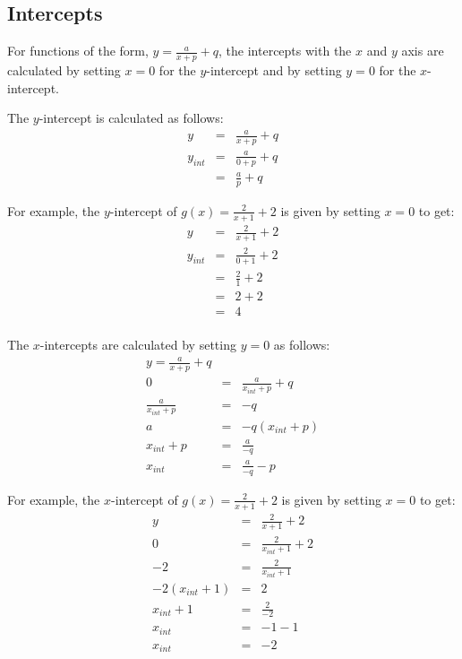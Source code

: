 \subsection{Intercepts}
For functions of the form, $y=\frac{a}{x+p} + q$, the intercepts with the $x$ and $y$ axis are calculated by setting $x=0$ for the $y$-intercept and by setting $y=0$ for the $x$-intercept.

The $y$-intercept is calculated as follows:
\begin{eqnarray}
y&=&\frac{a}{x+p} + q\\
y_{int}&=&\frac{a}{0+p} + q\\
&=&\frac{a}{p} + q
\end{eqnarray}

For example, the $y$-intercept of $g(x)=\frac{2}{x+1} + 2$ is given by setting $x=0$ to get:
\begin{eqnarray*}
y&=&\frac{2}{x+1} + 2\\
y_{int}&=&\frac{2}{0+1} + 2\\
&=&\frac{2}{1} + 2\\
&=&2+ 2\\
&=&4\\
\end{eqnarray*}

The $x$-intercepts are calculated by setting $y=0$ as follows:
\begin{eqnarray}
y=\frac{a}{x+p} + q\\
0&=&\frac{a}{x_{int}+p} + q\\
\frac{a}{x_{int}+p}&=&-q\\
a&=&-q(x_{int}+p)\\
x_{int}+p&=&\frac{a}{-q}\\
x_{int}&=&\frac{a}{-q}-p
\end{eqnarray}

For example, the $x$-intercept of $g(x)=\frac{2}{x+1} + 2$ is given by setting $x=0$ to get:
\begin{eqnarray*}
y&=&\frac{2}{x+1} + 2\\
0&=&\frac{2}{x_{int}+1} + 2\\
-2&=&\frac{2}{x_{int}+1}\\
-2(x_{int}+1)&=&2\\
x_{int}+1&=&\frac{2}{-2}\\
x_{int}&=&-1-1\\
x_{int}&=&-2
\end{eqnarray*}


